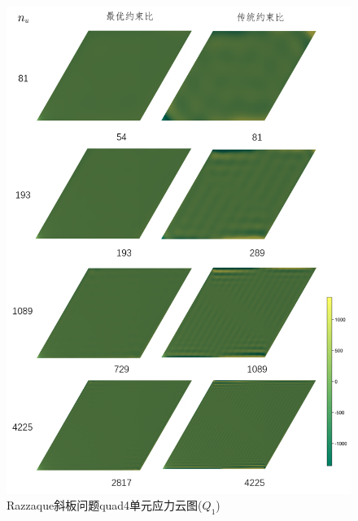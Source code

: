 \begin{figure}[!h]
    \centering 
        \includegraphics[scale=0.6]{figures/shearlocking/skewplateQ1_quad4.png}
        \caption{Razzaque斜板问题quad4单元应力云图($Q_1$)}\label{ch_5:fig:skewplateQ1_quad4}
\end{figure}

